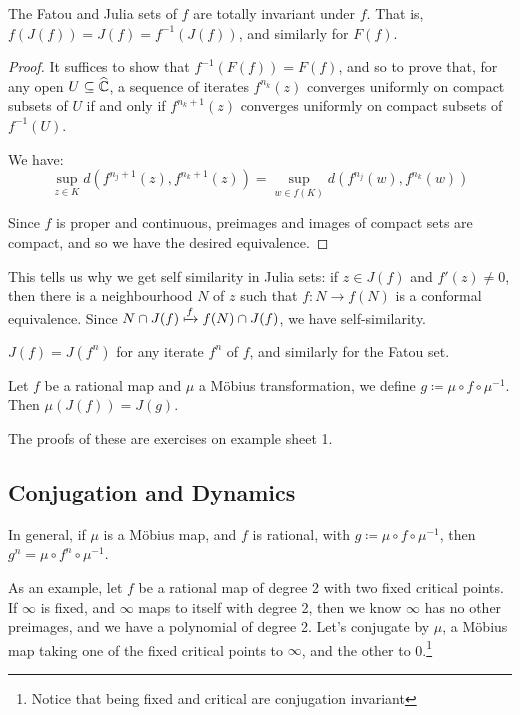 \documentclass[10pt,a4paper]{article}
\begin{document}
\begin{lemma}
  The Fatou and Julia sets of $f$ are totally invariant under $f$. That is, $f(J(f)) = J(f) = f^{-1}(J(f))$, and similarly for $F(f)$.
\end{lemma}
\begin{proof}
  It suffices to show that $f^{-1}(F(f)) = F(f)$, and so to prove that, for any open $U \subseteq \widehat{\mathbb{C}}$, a sequence of iterates $f^{n_k}(z)$ converges uniformly on compact subsets of $U$ if and only if $f^{n_k+1}(z)$ converges uniformly on compact subsets of $f^{-1}(U)$.

  We have:
  \[\sup_{z \in K}d(f^{n_j+1}(z), f^{n_k+1}(z)) = \sup_{w\in f(K)}d(f^{n_j}(w), f^{n_k}(w))\]

  Since $f$ is proper and continuous, preimages and images of compact sets are compact, and so we have the desired equivalence.
\end{proof}
This tells us why we get self similarity in Julia sets: if $z \in J(f)$ and $f'(z)\neq 0$, then there is a neighbourhood $N$ of $z$ such that $f:N \to f(N)$ is a conformal equivalence. Since $N \cap J(f) \xmapsto{f} f(N)\cap J(f)$, we have self-similarity.

\begin{lemma}
  $J(f) = J(f^n)$ for any iterate $f^n$ of $f$, and similarly for the Fatou set.
\end{lemma}
\begin{lemma}
  Let $f$ be a rational map and $\mu$ a M\"obius transformation, we define $g \coloneqq \mu \circ f \circ \mu^{-1}$. Then $\mu(J(f)) = J(g)$.
\end{lemma}
The proofs of these are exercises on example sheet 1.

\subsection{Conjugation and Dynamics}
In general, if $\mu$ is a M\"obius map, and $f$ is rational, with $g \coloneqq \mu\circ f\circ\mu^{-1}$, then \mbox{$g^n = \mu\circ f^n \circ \mu^{-1}$.}

As an example, let $f$ be a rational map of degree 2 with two fixed critical points. If $\infty$ is fixed, and $\infty$ maps to itself with degree 2, then we know $\infty$ has no other preimages, and we have a polynomial of degree 2. Let's conjugate by $\mu$, a M\"obius map taking one of the fixed critical points to $\infty$, and the other to 0.\footnote{Notice that being fixed and critical are conjugation invariant}
\end{document}
